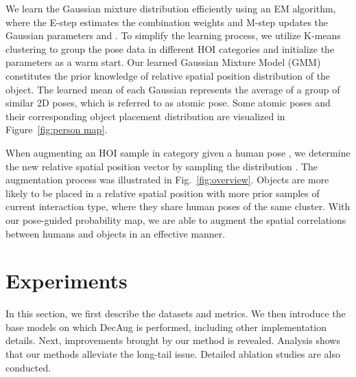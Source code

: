 \documentclass[10pt,twocolumn,letterpaper]{article}
\begin{document}
We learn the Gaussian mixture distribution  efficiently using an EM algorithm, where the E-step estimates the combination weights  and M-step updates the Gaussian parameters  and . To simplify the learning process, we utilize K-means clustering to group the pose data in different HOI categories and initialize the parameters as a warm start. Our learned Gaussian Mixture Model (GMM) constitutes the prior knowledge of relative spatial position distribution of the object. The learned mean  of each Gaussian represents the average of a group of similar 2D poses, which is referred to as atomic pose. Some atomic poses and their corresponding object placement distribution are visualized in Figure~\ref{fig:person map}.

When augmenting an HOI sample in category  given a human pose , we determine the new relative spatial position vector  by sampling the distribution . The augmentation process was illustrated in Fig.~\ref{fig:overview}. Objects are more likely to be placed in a relative spatial position with more prior samples of current interaction type, where they share human poses of the same cluster. With our pose-guided probability map, we are able to augment the spatial correlations between humans and objects in an effective manner.
\iffalse
\begin{figure}[tb!]
\centering

\subfigure{
\texttt{[image: fig/386872\_raw\_box.png]}
\texttt{[image: fig/386872\_heatmap\_ins.png]}
\texttt{[image: fig/386872\_boost\_box.png]}
}

\vfill

\subfigure{
\texttt{[image: fig/518957\_raw\_box.png]}
\texttt{[image: fig/518957\_heatmap\_ins.png]}
\texttt{[image: fig/518957\_boost\_box.png]}
}
\caption{The left are original images while the right are augmented ones. And middle images are the \textit{pose-guided probability map}. Objects are more likely to be placed in red regions than blue regions. For clarity, we temporarily disable the local object appearance augmentation.}
\label{fig:stochastic map}
\end{figure}
\fi

\section{Experiments}
In this section, we first describe the datasets and metrics. We then introduce the base models on which DecAug is performed, including other implementation details. Next, improvements brought by our method is revealed. Analysis shows that our methods alleviate the long-tail issue. Detailed ablation studies are also conducted.
\end{document}
